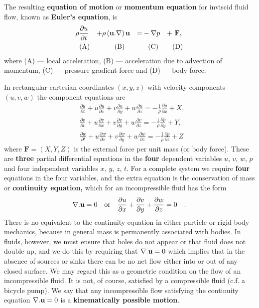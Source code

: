 \documentclass[10pt]{report}
\begin{document}
The resulting \textbf{equation of motion} or \textbf{momentum equation} for
inviscid fluid flow, known as \textbf{Euler's equation}, is
\begin{alignat*}{4}
& \rho \frac{\partial u}{\partial t} & +
& \rho  \left( {{{\bf u}}. \nabla } \right){{\bf u}}  & =
& -\nabla p & + &\  \textbf{F} , \\
&\hbox{\;\;(A)}&
&\hbox{\;\; \;\; (B) }&
&\hbox{\;\;\;(C)}&
&\hbox{(D)}\end{alignat*}
where (A) --- local acceleration, (B) --- acceleration due to advection of momentum, (C) --- pressure gradient force and (D) --- body force.

In rectangular cartesian coordinates $(x,y,z)$ with velocity components
$(u,v,w)$ the component equations are
\begin{align*}
&\frac{\partial u}{\partial t}+u\frac{\partial u}{\partial
x}+v\frac{\partial u}{\partial y}+w\frac{\partial
u}{\partial z}=-\frac{1}{\rho }\frac{\partial p}{\partial
x}+X, \\
& \frac{\partial v}{\partial t}+u\frac{\partial v}{\partial
x}+v\frac{\partial v}{\partial y}+w\frac{\partial
v}{\partial z}=-\frac{1}{\rho }\frac{\partial p}{\partial
y}+Y, \\
& \frac{\partial w}{\partial t}+u\frac{\partial w}{\partial
x}+v\frac{\partial w}{\partial y}+w\frac{\partial
w}{\partial z}=-\frac{1}{\rho }\frac{\partial p}{\partial
z}+Z
\end{align*}
where $ \textbf{F} = (X,Y,Z)$ is the external force per unit mass (or body
force). These are \textbf{three} partial differential equations in the
\textbf{four} dependent variables $u$, $v$, $w$, $p$ and four independent variables
$x$, $y$, $z$, $t$. For a complete system we require \textbf{four} equations in the
four variables, and the extra equation is the conservation of mass or
\textbf{continuity equation,} which for an incompressible fluid has the form
\[
\nabla . {\bf u}=0\quad\hbox{or} \quad \frac{\partial
u}{\partial x}+\frac{\partial v}{\partial y}+\frac{\partial
w}{\partial z}=0\quad .
\]
There is no equivalent to the continuity equation in either particle or
rigid body mechanics, because in general mass is permanently associated with
bodies. In fluids, however, we must ensure that holes do not appear or that
fluid does not double up, and we do this by requiring that $\nabla .
{\bf u}=0$ which implies that in the absence of sources or sinks there can be no
net flow either into or out of any closed surface. We may regard this as a
geometric condition on the flow of an incompressible fluid. It is not, of
course, satisfied by a compressible fluid (c.f. a bicycle pump). We say that
any incompressible flow satisfying the continuity equation $\nabla .
{{\bf u}}=0$ is a \textbf{kinematically possible motion}.
\end{document}
